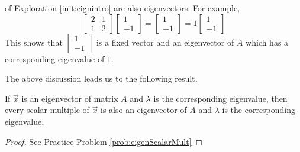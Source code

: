 \documentclass{ximera}
\begin{document}
\begin{center}
\end{center}

 of Exploration \ref{init:eignintro} are also eigenvectors. 
For example,  
$$\begin{bmatrix} 2& 1\\ 1&2 \end{bmatrix} \begin{bmatrix} 1\\ -1 \end{bmatrix} =
\begin{bmatrix} 1\\ -1 \end{bmatrix}= 1 \begin{bmatrix} 1\\ -1 \end{bmatrix}$$
This shows that $\begin{bmatrix} 1\\ -1 \end{bmatrix}$ is a fixed vector and an eigenvector of $A$ which has a corresponding eigenvalue of $1$.

The above discussion leads us to the following result.

\begin{theorem}\label{th:eigenScalarMult}
    If $\vec{x}$ is an eigenvector of matrix $A$ and $\lambda$ is the corresponding eigenvalue, then every scalar multiple of $\vec{x}$ is also an eigenvector of $A$ 
 and $\lambda$ is the corresponding eigenvalue.
\end{theorem}
\begin{proof}
See Practice Problem \ref{prob:eigenScalarMult}
\end{proof}
\end{document}
